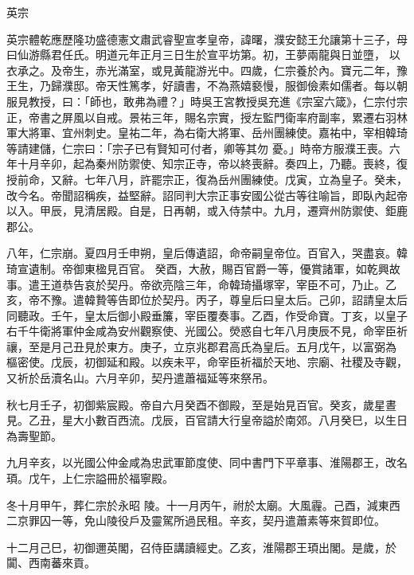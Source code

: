 
\begin{pinyinscope}

 英宗



 英宗體乾應歷隆功盛德憲文肅武睿聖宣孝皇帝，諱曙，濮安懿王允讓第十三子，母曰仙游縣君任氏。明道元年正月三日生於宣平坊第。初，王夢兩龍與日並墮，
 以衣承之。及帝生，赤光滿室，或見黃龍游光中。四歲，仁宗養於內。寶元二年，豫王生，乃歸濮邸。帝天性篤孝，好讀書，不為燕嬉褻慢，服御儉素如儒者。每以朝服見教授，曰：「師也，敢弗為禮？」時吳王宮教授吳充進《宗室六箴》，仁宗付宗正，帝書之屏風以自戒。景祐三年，賜名宗實，授左監門衛率府副率，累遷右羽林軍大將軍、宜州刺史。皇祐二年，為右衛大將軍、岳州團練使。嘉祐中，宰相韓琦等請建儲，仁宗曰：「宗子已有賢知可付者，卿等其勿
 憂。」時帝方服濮王喪。六年十月辛卯，起為秦州防禦使、知宗正寺，帝以終喪辭。奏四上，乃聽。喪終，復授前命，又辭。七年八月，許罷宗正，復為岳州團練使。戊寅，立為皇子。癸未，改今名。帝聞詔稱疾，益堅辭。詔同判大宗正事安國公從古等往喻旨，即臥內起帝以入。甲辰，見清居殿。自是，日再朝，或入侍禁中。九月，遷齊州防禦使、鉅鹿郡公。



 八年，仁宗崩。夏四月壬申朔，皇后傳遺詔，命帝嗣皇帝位。百官入，哭盡哀。韓琦宣遺制。帝御東楹見百官。
 癸酉，大赦，賜百官爵一等，優賞諸軍，如乾興故事。遣王道恭告哀於契丹。帝欲亮陰三年，命韓琦攝塚宰，宰臣不可，乃止。乙亥，帝不豫。遣韓贄等告即位於契丹。丙子，尊皇后曰皇太后。己卯，詔請皇太后同聽政。壬午，皇太后御小殿垂簾，宰臣覆奏事。乙酉，作受命寶。丁亥，以皇子右千牛衛將軍仲金咸為安州觀察使、光國公。熒惑自七年八月庚辰不見，命宰臣祈禳，至是月己丑見於東方。庚子，立京兆郡君高氏為皇后。五月戊午，以富弼為
 樞密使。戊辰，初御延和殿。以疾未平，命宰臣祈福於天地、宗廟、社稷及寺觀，又祈於岳瀆名山。六月辛卯，契丹遣蕭福延等來祭吊。



 秋七月壬子，初御紫宸殿。帝自六月癸酉不御殿，至是始見百官。癸亥，歲星晝見。乙丑，星大小數百西流。戊辰，百官請大行皇帝謚於南郊。八月癸巳，以生日為壽聖節。



 九月辛亥，以光國公仲金咸為忠武軍節度使、同中書門下平章事、淮陽郡王，改名頊。戊午，上仁宗謚冊於福寧殿。



 冬十月甲午，葬仁宗於永昭
 陵。十一月丙午，祔於太廟。大風霾。己酉，減東西二京罪囚一等，免山陵役戶及靈駕所過民租。辛亥，契丹遣蕭素等來賀即位。



 十二月己巳，初御邇英閣，召侍臣講讀經史。乙亥，淮陽郡王頊出閣。是歲，於闐、西南蕃來貢。




\end{pinyinscope}
